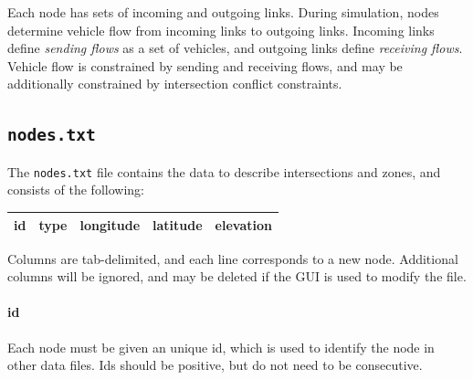Each node has sets of incoming and outgoing links. During simulation, nodes determine vehicle flow from incoming links to outgoing links. Incoming links define \textit{sending flows} as a set of vehicles, and outgoing links define \textit{receiving flows}. Vehicle flow is constrained by sending and receiving flows, and may be additionally constrained by intersection conflict constraints. 

\subsection{\texttt{nodes.txt}}
The \texttt{nodes.txt} file contains the data to describe intersections and zones, and consists of the following:
\begin{center}
\begin{tabular}{ccccc}
\hline
id & type & longitude & latitude  & elevation \\\hline
\end{tabular}
\end{center}
Columns are tab-delimited, and each line corresponds to a new node. Additional columns will be ignored, and may be deleted if the GUI is used to modify the file.

\paragraph*{id}
Each node must be given an unique id, which is used to identify the node in other data files. Ids should be positive, but do not need to be consecutive.

